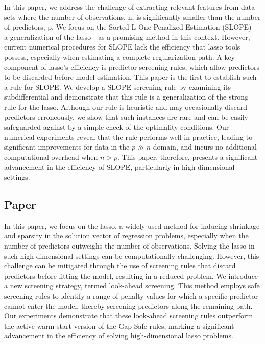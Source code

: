 \documentclass{book}
\begin{document}
In this paper, we address the challenge of extracting relevant features from data sets where the number of observations, n, is significantly smaller than the number of predictors, p. We focus on the Sorted L-One Penalized Estimation (SLOPE)—a generalization of the lasso—as a promising method in this context. However, current numerical procedures for SLOPE lack the efficiency that lasso tools possess, especially when estimating a complete regularization path. A key component of lasso's efficiency is predictor screening rules, which allow predictors to be discarded before model estimation. This paper is the first to establish such a rule for SLOPE. We develop a SLOPE screening rule by examining its subdifferential and demonstrate that this rule is a generalization of the strong rule for the lasso. Although our rule is heuristic and may occasionally discard predictors erroneously, we show that such instances are rare and can be easily safeguarded against by a simple check of the optimality conditions. Our numerical experiments reveal that the rule performs well in practice, leading to significant improvements for data in the \(p \gg n\) domain, and incurs no additional computational overhead when \(n > p\). This paper, therefore, presents a significant advancement in the efficiency of SLOPE, particularly in high-dimensional settings.

\subsection{Paper \II}

In this paper, we focus on the lasso, a widely used method for inducing shrinkage and sparsity in the solution vector of regression problems, especially when the number of predictors outweighs the number of observations. Solving the lasso in such high-dimensional settings can be computationally challenging. However, this challenge can be mitigated through the use of screening rules that discard predictors before fitting the model, resulting in a reduced problem. We introduce a new screening strategy, termed look-ahead screening. This method employs safe screening rules to identify a range of penalty values for which a specific predictor cannot enter the model, thereby screening predictors along the remaining path. Our experiments demonstrate that these look-ahead screening rules outperform the active warm-start version of the Gap Safe rules, marking a significant advancement in the efficiency of solving high-dimensional lasso problems.
\end{document}
